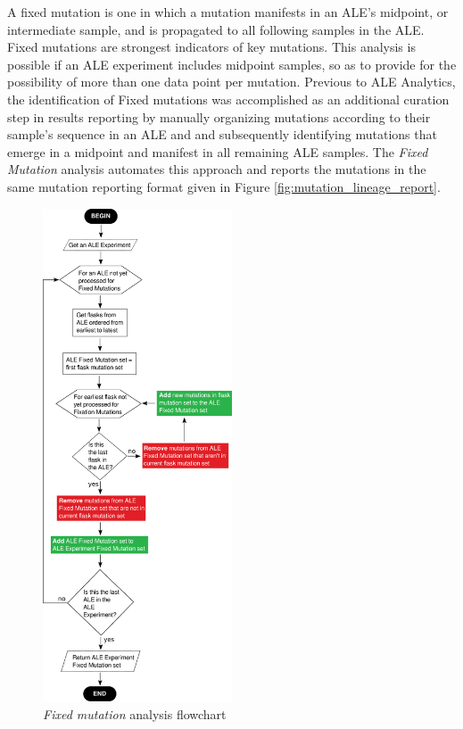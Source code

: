 \documentclass[12pt,final,masters,chapterheads]{ucsd}  %
\begin{document}
A fixed mutation is one in which a mutation manifests in an ALE's midpoint, or intermediate sample, and is propagated to all following samples in the ALE. Fixed mutations are strongest indicators of key mutations. This analysis is possible if an ALE experiment includes midpoint samples, so as to provide for the possibility of more than one data point per mutation. Previous to ALE Analytics, the identification of Fixed mutations was accomplished as an additional curation step in results reporting by manually organizing mutations according to their sample's sequence in an ALE and and subsequently identifying mutations that emerge in a midpoint and manifest in all remaining ALE samples. The \textit{Fixed Mutation} analysis automates this approach and reports the mutations in the same mutation reporting format given in Figure \ref{fig:mutation_lineage_report}.
\begin{figure}[H]
  \caption{\textit{Fixed mutation} analysis flowchart}
  \centering
  \includegraphics[width=0.50\textwidth]{fixed_mutation_flowchart.png}
\end{figure}
\end{document}
